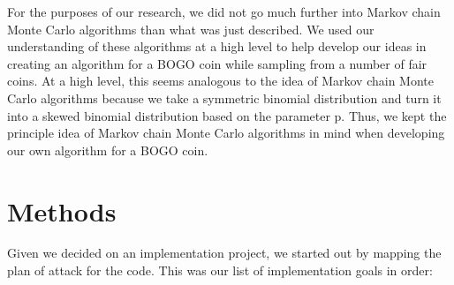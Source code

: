 \documentclass[11pt]{article}
\begin{document}
For the purposes of our research, we did not go much further into Markov chain Monte 
Carlo algorithms than what was just described. We used our understanding of these algorithms at 
a high level to help develop our ideas in creating an algorithm for a BOGO coin while sampling 
from a number of fair coins. At a high level, this seems analogous to the idea of Markov chain 
Monte Carlo algorithms because we take a symmetric binomial distribution and turn it into a 
skewed binomial distribution based on the parameter p. Thus, we kept the principle idea of Markov 
chain Monte Carlo algorithms in mind when developing our own algorithm for a BOGO coin.


\section*{Methods}

\quad Given we decided on an implementation project, we started out by mapping the plan of attack for
the code. This was our list of implementation goals in order:
\end{document}

